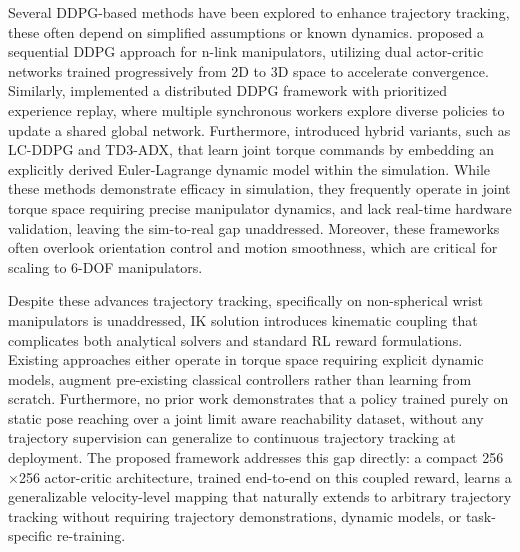\documentclass[preprint,12pt]{elsarticle}
\begin{document}
Several DDPG-based methods have been explored to enhance trajectory tracking, these often depend on simplified assumptions or known dynamics. \cite{majumder2024enhancing} proposed a sequential DDPG approach for n-link manipulators, utilizing dual actor-critic networks trained progressively from 2D to 3D space to accelerate convergence. Similarly, \cite{zhang2019trajectory} implemented a distributed DDPG framework with prioritized experience replay, where multiple synchronous workers explore diverse policies to update a shared global network. Furthermore, \cite{hazem2025reinforcement} introduced hybrid variants, such as LC-DDPG and TD3-ADX, that learn joint torque commands by embedding an explicitly derived Euler-Lagrange dynamic model within the simulation. While these methods demonstrate efficacy in simulation, they frequently operate in joint torque space requiring precise manipulator dynamics, and lack real-time hardware validation, leaving the sim-to-real gap unaddressed. Moreover, these frameworks often overlook orientation control and motion smoothness, which are critical for scaling to 6-DOF manipulators.

Despite these advances trajectory tracking, specifically on non-spherical wrist manipulators is unaddressed, IK solution introduces kinematic coupling that complicates both analytical solvers and standard RL reward formulations. Existing approaches either operate in torque space requiring explicit dynamic models, augment pre-existing classical controllers rather than learning from scratch. Furthermore, no prior work demonstrates that a policy trained purely on static pose reaching over a joint limit aware reachability dataset, without any trajectory supervision can generalize to continuous trajectory tracking at deployment. The proposed framework addresses this gap directly: a compact
256$\times$256 actor-critic architecture, trained end-to-end on this
coupled reward, learns a generalizable velocity-level mapping that
naturally extends to arbitrary trajectory tracking without requiring
trajectory demonstrations, dynamic models, or task-specific re-training. 

\end{document}
